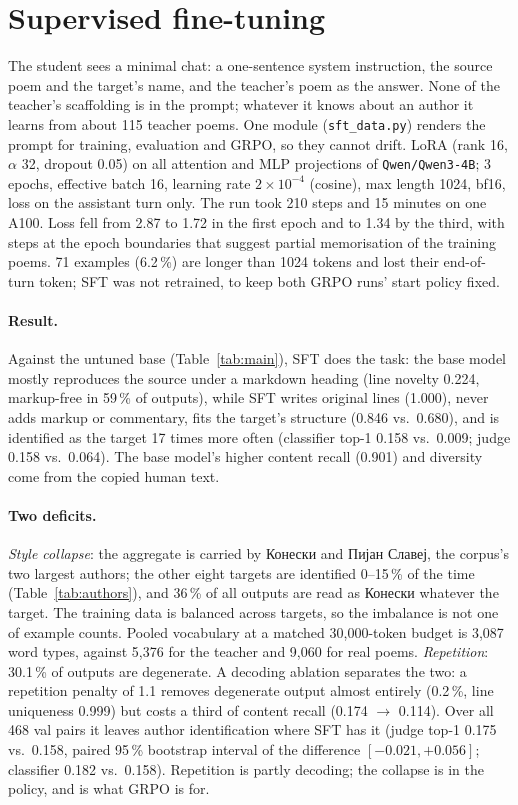 \documentclass[11pt]{article}
\begin{document}
\section{Supervised fine-tuning}\label{sec:sft}

The student sees a minimal chat: a one-sentence system instruction, the source
poem and the target's name, and the teacher's poem as the answer. None of the
teacher's scaffolding is in the prompt; whatever it knows about an author it
learns from about 115 teacher poems. One module (\texttt{sft\_data.py})
renders the prompt for training, evaluation and GRPO, so they cannot drift.
LoRA (rank 16, $\alpha$ 32, dropout 0.05) on all attention and MLP projections
of \texttt{Qwen/Qwen3-4B}; 3 epochs, effective batch 16, learning rate
$2\times10^{-4}$ (cosine), max length 1024, bf16, loss on the assistant turn
only. The run took 210 steps and 15 minutes on one A100. Loss fell from 2.87
to 1.72 in the first epoch and to 1.34 by the third, with steps at the epoch
boundaries that suggest partial memorisation of the training poems. 71
examples (6.2\,\%) are longer than 1024 tokens and lost their end-of-turn
token; SFT was not retrained, to keep both GRPO runs' start policy fixed.

\paragraph{Result.} Against the untuned base (Table~\ref{tab:main}), SFT
does the task: the base model mostly reproduces the source under a markdown
heading (line novelty 0.224, markup-free in 59\,\% of outputs), while SFT
writes original lines (1.000), never adds markup or commentary, fits the
target's structure (0.846 vs.\ 0.680), and is identified as the target 17
times more often (classifier top-1 0.158 vs.\ 0.009; judge 0.158 vs.\ 0.064).
The base model's higher content recall (0.901) and diversity come from the
copied human text.

\paragraph{Two deficits.} \emph{Style collapse}: the aggregate is carried by
Конески and Пијан Славеј, the corpus's two largest authors; the other eight
targets are identified 0--15\,\% of the time (Table~\ref{tab:authors}), and
36\,\% of all outputs are read as Конески whatever the target. The training
data is balanced across targets, so the imbalance is not one of example
counts. Pooled vocabulary at a matched 30{,}000-token budget is 3{,}087 word
types, against 5{,}376 for the teacher and 9{,}060 for real poems.
\emph{Repetition}: 30.1\,\% of outputs are degenerate. A decoding ablation
separates the two: a repetition penalty of 1.1 removes degenerate output
almost entirely (0.2\,\%, line uniqueness 0.999) but costs a third of content
recall (0.174 $\to$ 0.114). Over all 468 val pairs it leaves author
identification where SFT has it (judge top-1 0.175 vs.\ 0.158, paired 95\,\%
bootstrap interval of the difference $[-0.021, +0.056]$; classifier 0.182 vs.\
0.158). Repetition is partly decoding; the collapse is in the policy, and is
what GRPO is for.
\end{document}
